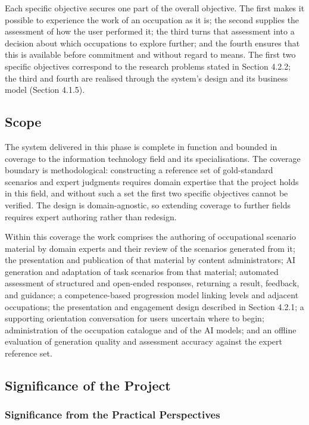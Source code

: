 Each specific objective secures one part of the overall objective. The first makes it possible to experience the work of an occupation as it is; the second supplies the assessment of how the user performed it; the third turns that assessment into a decision about which occupations to explore further; and the fourth ensures that this is available before commitment and without regard to means. The first two specific objectives correspond to the research problems stated in Section 4.2.2; the third and fourth are realised through the system's design and its business model (Section 4.1.5).

\subsection{Scope}

The system delivered in this phase is complete in function and bounded in coverage to the information technology field and its specialisations. The coverage boundary is methodological: constructing a reference set of gold-standard scenarios and expert judgments requires domain expertise that the project holds in this field, and without such a set the first two specific objectives cannot be verified. The design is domain-agnostic, so extending coverage to further fields requires expert authoring rather than redesign.

Within this coverage the work comprises the authoring of occupational scenario material by domain experts and their review of the scenarios generated from it; the presentation and publication of that material by content administrators; AI generation and adaptation of task scenarios from that material; automated assessment of structured and open-ended responses, returning a result, feedback, and guidance; a competence-based progression model linking levels and adjacent occupations; the presentation and engagement design described in Section 4.2.1; a supporting orientation conversation for users uncertain where to begin; administration of the occupation catalogue and of the AI models; and an offline evaluation of generation quality and assessment accuracy against the expert reference set.

\subsection{Significance of the Project}

\subsubsection{Significance from the Practical Perspectives}

